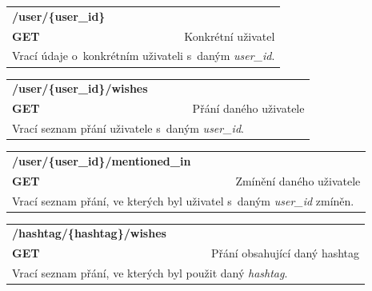 \documentclass[thesis=B,czech]{FITthesis}[2012/06/26]
\begin{document}
\begin{table}[h]
\begin{tabular}{llllr}
\rowcolor[HTML]{EFEFEF}
\large \textbf{/user/\{user\_id\}}        &         &                 &        & \multicolumn{1}{l}{}                \\
\rowcolor[HTML]{EFEFEF}
\textbf{GET}          &         &                 &        & Konkrétní uživatel                        \\
\multicolumn{5}{l}{\parbox[t]{12.8cm}{Vrací údaje o~konkrétním uživateli s~daným \textit{user\_id}. }  } \\  
\end{tabular}
\end{table}


\begin{table}[h]
\begin{tabular}{llllr}
\rowcolor[HTML]{EFEFEF}
\large \textbf{/user/\{user\_id\}/wishes}        &         &                 &        & \multicolumn{1}{l}{}                \\
\rowcolor[HTML]{EFEFEF}
\textbf{GET}          &         &                 &        & Přání daného uživatele                        \\
\multicolumn{5}{l}{\parbox[t]{12.8cm}{Vrací seznam přání uživatele s~daným \textit{user\_id}. }  } \\  
\end{tabular}
\end{table}

\begin{table}[h]
\begin{tabular}{llllr}
\rowcolor[HTML]{EFEFEF}
\large \textbf{/user/\{user\_id\}/mentioned\_in}        &         &                 &        & \multicolumn{1}{l}{}                \\
\rowcolor[HTML]{EFEFEF}
\textbf{GET}          &         &                 &        & Zmínění daného uživatele                        \\
\multicolumn{5}{l}{\parbox[t]{12.8cm}{Vrací seznam přání, ve kterých byl uživatel s~daným \textit{user\_id} zmíněn. }  } \\  
\end{tabular}
\end{table}


\begin{table}[h]
\begin{tabular}{llllr}
\rowcolor[HTML]{EFEFEF}
\large \textbf{/hashtag/\{hashtag\}/wishes}        &         &                 &        & \multicolumn{1}{l}{}                \\
\rowcolor[HTML]{EFEFEF}
\textbf{GET}          &         &                 &        & Přání obsahující daný hashtag                       \\
\multicolumn{5}{l}{\parbox[t]{12.8cm}{Vrací seznam přání, ve kterých byl použit daný \textit{hashtag}. }  } \\  
\end{tabular}
\end{table}
\end{document}
